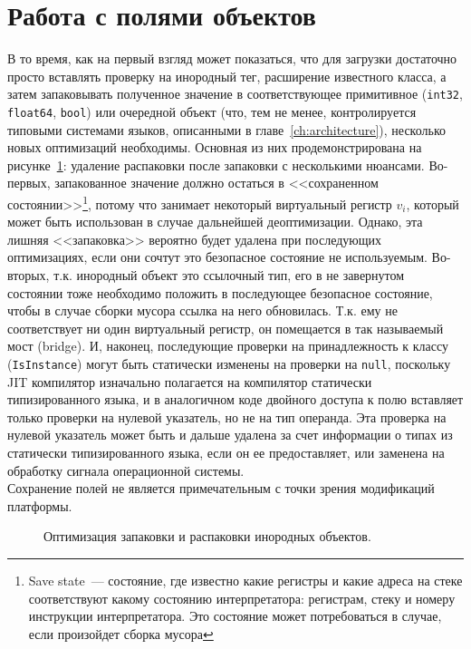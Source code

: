 \documentclass[times
]{itmo-student-thesis}
\begin{document}
\section{Работа с полями объектов}\label{ch:work-with-fields}
В то время, как на первый взгляд может показаться, что для загрузки достаточно просто вставлять проверку на инородный тег, расширение известного класса, а затем запаковывать полученное значение в соответствующее примитивное (\texttt{int32}, \texttt{float64}, \texttt{bool}) или очередной объект (что, тем не менее, контролируется типовыми системами языков, описанными в главе~\ref{ch:architecture}), несколько новых оптимизаций необходимы. Основная из них продемонстрирована на рисунке~\ref{fig:field-opt}: удаление распаковки после запаковки с несколькими нюансами. Во-первых, запакованное значение должно остаться в <<сохраненном состоянии>>\footnote{Save state~--- состояние, где известно какие регистры и какие адреса на стеке соответствуют какому состоянию интерпретатора: регистрам, стеку и номеру инструкции интерпретатора. Это состояние может потребоваться в случае, если произойдет сборка мусора}, потому что занимает некоторый виртуальный регистр $v_i$, который может быть использован в случае дальнейшей деоптимизации. Однако, эта лишняя <<запаковка>> вероятно будет удалена при последующих оптимизациях, если они сочтут это безопасное состояние не используемым. Во-вторых, т.к. инородный объект это ссылочный тип, его в не завернутом состоянии тоже необходимо положить в последующее безопасное состояние, чтобы в случае сборки мусора ссылка на него обновилась. Т.к. ему не соответствует ни один виртуальный регистр, он помещается в так называемый мост (bridge). И, наконец, последующие проверки на принадлежность к классу (\texttt{IsInstance}) могут быть статически изменены на проверки на \texttt{null}, поскольку JIT компилятор изначально полагается на компилятор статически типизированного языка, и в аналогичном коде двойного доступа к полю вставляет только проверки на нулевой указатель, но не на тип операнда. Эта проверка на нулевой указатель может быть и дальше удалена за счет информации о типах из статически типизированного языка, если он ее предоставляет, или заменена на обработку сигнала операционной системы.\\
Сохранение полей не является примечательным с точки зрения модификаций платформы.

\begin{figure}[!h]
	\caption{Оптимизация запаковки и распаковки инородных объектов.}\label{fig:field-opt}
	\centering
	\end{figure}
\end{document}

